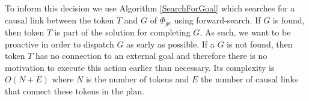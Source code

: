 To inform this decision we use Algorithm \ref{SearchForGoal} which
searches for a causal link between the token $T$ and $G$ of
$\Phi_{ge}$ using forward-search. If $G$ is found, then token $T$ is
part of the solution for completing $G$. As such, we want to be
proactive in order to dispatch $G$ as early as possible. If a $G$ is
not found, then token $T$ has no connection to an external goal and
therefore there is no motivation to execute this action earlier than
necessary. Its complexity is $O(N+E)$ \cite{corman} where $N$ is the
number of tokens and $E$ the number of causal links that connect these
tokens in the plan.

%
%
%
%
